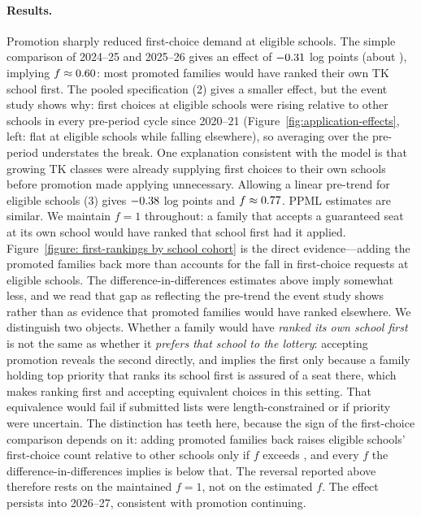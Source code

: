 \documentclass{article}
\begin{document}
\paragraph{Results.} Promotion sharply reduced first-choice demand at eligible schools. The simple comparison of 2024--25 and 2025--26 gives an effect of $-0.31$ log points (about \numDidFirstTwoPct), implying $f \approx 0.60$: most promoted families would have ranked their own TK school first. The pooled specification (2) gives a smaller effect, but the event study shows why: first choices at eligible schools were rising relative to other schools in every pre-period cycle since 2020--21 (Figure~\ref{fig:application-effects}, left: flat at eligible schools while falling elsewhere), so averaging over the pre-period understates the break. One explanation consistent with the model is that growing TK classes were already supplying first choices to their own schools before promotion made applying unnecessary. Allowing a linear pre-trend for eligible schools (3) gives $-0.38$ log points and $f \approx 0.77$. PPML estimates are similar. We maintain $f = 1$ throughout: a family that accepts a guaranteed seat at its own school would have ranked that school first had it applied. Figure~\ref{figure: first-rankings by school cohort} is the direct evidence---adding the promoted families back more than accounts for the fall in first-choice requests at eligible schools. The difference-in-differences estimates above imply somewhat less, and we read that gap as reflecting the pre-trend the event study shows rather than as evidence that promoted families would have ranked elsewhere. We distinguish two objects. Whether a family would have \emph{ranked its own school first} is not the same as whether it \emph{prefers that school to the lottery}: accepting promotion reveals the second directly, and implies the first only because a family holding top priority that ranks its school first is assured of a seat there, which makes ranking first and accepting equivalent choices in this setting. That equivalence would fail if submitted lists were length-constrained or if priority were uncertain. The distinction has teeth here, because the sign of the first-choice comparison depends on it: adding promoted families back raises eligible schools' first-choice count relative to other schools only if $f$ exceeds \numFBreakeven, and every $f$ the difference-in-differences implies is below that. The reversal reported above therefore rests on the maintained $f = 1$, not on the estimated $f$. The effect persists into 2026--27, consistent with promotion continuing.
\end{document}
